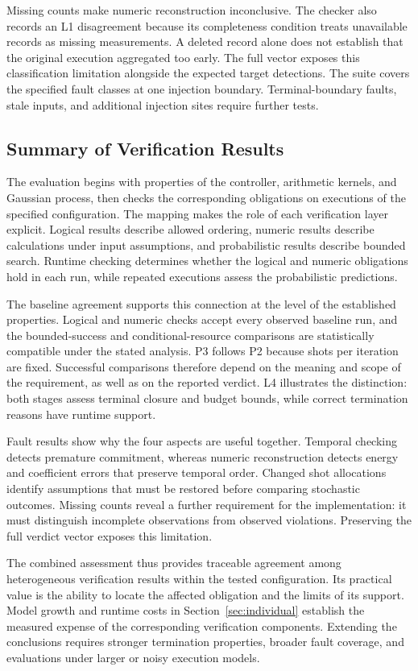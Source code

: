 \documentclass[conference]{IEEEtran}
\begin{document}
Missing counts make numeric reconstruction inconclusive. The checker also records an L1 disagreement because its completeness condition treats unavailable records as missing measurements. A deleted record alone does not establish that the original execution aggregated too early. The full vector exposes this classification limitation alongside the expected target detections. The suite covers the specified fault classes at one injection boundary. Terminal-boundary faults, stale inputs, and additional injection sites require further tests.

\subsection{Summary of Verification Results}
The evaluation begins with properties of the controller, arithmetic kernels, and Gaussian process, then checks the corresponding obligations on executions of the specified configuration. The mapping makes the role of each verification layer explicit. Logical results describe allowed ordering, numeric results describe calculations under input assumptions, and probabilistic results describe bounded search. Runtime checking determines whether the logical and numeric obligations hold in each run, while repeated executions assess the probabilistic predictions.

The baseline agreement supports this connection at the level of the established properties. Logical and numeric checks accept every observed baseline run, and the bounded-success and conditional-resource comparisons are statistically compatible under the stated analysis. P3 follows P2 because shots per iteration are fixed. Successful comparisons therefore depend on the meaning and scope of the requirement, as well as on the reported verdict. L4 illustrates the distinction: both stages assess terminal closure and budget bounds, while correct termination reasons have runtime support.

Fault results show why the four aspects are useful together. Temporal checking detects premature commitment, whereas numeric reconstruction detects energy and coefficient errors that preserve temporal order. Changed shot allocations identify assumptions that must be restored before comparing stochastic outcomes. Missing counts reveal a further requirement for the implementation: it must distinguish incomplete observations from observed violations. Preserving the full verdict vector exposes this limitation.

The combined assessment thus provides traceable agreement among heterogeneous verification results within the tested configuration. Its practical value is the ability to locate the affected obligation and the limits of its support. Model growth and runtime costs in Section~\ref{sec:individual} establish the measured expense of the corresponding verification components. Extending the conclusions requires stronger termination properties, broader fault coverage, and evaluations under larger or noisy execution models.
\end{document}
